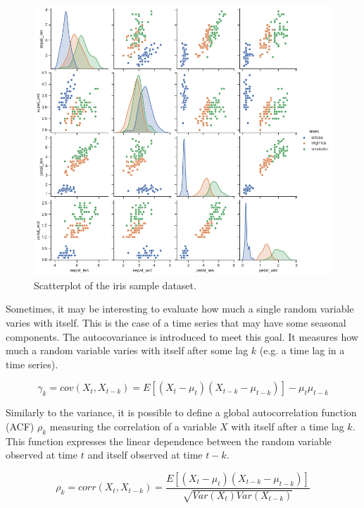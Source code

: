 \begin{figure}[hbt!]
\centering
\includegraphics[width=1\textwidth]{SectionLetsMath/elemStat_figures/fig_irisCorrelation.png}
\captionsetup{type=figure}
\caption{Scatterplot of the iris sample dataset.}
\label{fig_irisCorrelation}
\end{figure}

Sometimes, it may be interesting to evaluate how much a single random variable varies with itself. This is the case of a time series that may have some seasonal components. The autocovariance is introduced to meet this goal. It measures how much a random variable varies with itself after some lag $k$ (e.g. a time lag in a time series).

\begin{equation}
\gamma_k=cov\left(X_t,X_{t-k}\right)=E\left[\left(X_t-\mu_t\right)\left(X_{t-k}-\mu_{t-k}\right)\right]-\mu_t\mu_{t-k}
\label{eq_autocovariance}
\end{equation}

Similarly to the variance, it is possible to define a global autocorrelation function (ACF) $\rho_k$ measuring the correlation of a variable $X$ with itself after a time lag $k$. This function expresses the linear dependence between the random variable observed at time $t$ and itself observed at time $t-k$.

\begin{equation}
\rho_k=corr\left(X_t,X_{t-k}\right)=\frac{E[(X_t-\mu_t)(X_{t-k}-\mu_{t-k})]}{\sqrt{Var(X_t)Var(X_{t-k})}}
\label{eq_ACF}
\end{equation}

